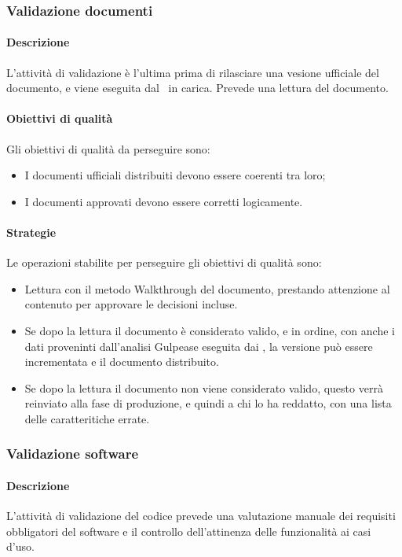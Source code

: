 \documentclass[../NormeDiProgetto_v3.0.0.tex]{subfiles}
\begin{document}
			\subsubsection{Validazione documenti}
				\paragraph{Descrizione}
					L'attività di validazione è l'ultima prima di rilasciare una vesione ufficiale del documento, e viene eseguita dal \responsabilediprogetto\ in carica.
					Prevede una lettura del documento. 
				\paragraph{Obiettivi di qualità}
				Gli obiettivi di qualità da perseguire sono:
				\begin{itemize}
					\item I documenti ufficiali distribuiti devono essere coerenti tra loro;
					\item I documenti approvati devono essere corretti logicamente.
				\end{itemize}

				\paragraph{Strategie}
					Le operazioni stabilite per perseguire gli obiettivi di qualità sono:
					\begin{itemize}
						\item Lettura con il metodo Walkthrough del documento, prestando attenzione al contenuto per approvare le decisioni incluse.
						\item Se dopo la lettura il documento è considerato valido, e in ordine, con anche i dati proveninti dall'analisi Gulpease eseguita dai \verificatori, la versione può essere incrementata e il documento distribuito.
						\item Se dopo la lettura il documento non viene considerato valido, questo verrà reinviato alla fase di produzione, e quindi a chi lo ha reddatto, con una lista delle caratteritiche errate.
					\end{itemize}

			\subsubsection{Validazione software}
				\paragraph{Descrizione}
				L'attività di validazione del codice prevede una valutazione manuale dei requisiti obbligatori del software e il controllo dell'attinenza delle funzionalità ai casi d'uso.
				
\end{document}
